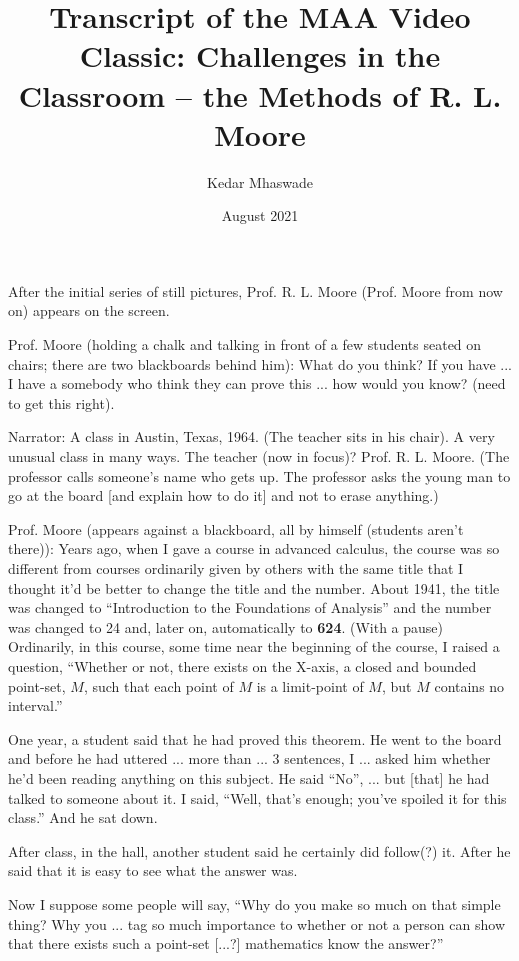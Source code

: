 \documentclass[a6paper]{article}
\begin{document}
\title{Transcript of the MAA Video Classic: Challenges in the Classroom -- the Methods of R. L. Moore}
\date{August 2021}
\author{Kedar Mhaswade}
\maketitle

After the initial series of still pictures, Prof. R. L. Moore (Prof. Moore from now on) appears on the screen.

Prof. Moore (holding a chalk and talking in front of a few students seated on chairs; there are two blackboards behind him): What do you think? If you have ... I have a somebody who think they can prove this ... how would you know?
(need to get this right).

Narrator: A class in Austin, Texas, 1964. (The teacher sits in his chair). A very unusual class in many ways. The teacher (now in focus)? Prof. R. L. Moore. (The professor calls someone's name who gets up. The professor asks the young man to go at the board [and explain how to do it] and not to erase anything.)

Prof. Moore (appears against a blackboard, all by himself (students aren't there)): Years ago, when I gave a course in advanced calculus, the course was so different from courses ordinarily given by others with the same title that I thought it'd be better to change the title and the number. About 1941, the title was changed to ``Introduction to the Foundations of Analysis'' and the number was changed to 24 and, later on, automatically to \textbf{624}. (With a pause) Ordinarily, in this course, some time near the beginning of the course, I raised a question, ``Whether or not, there exists on the X-axis, a closed and bounded point-set, $M$, such that each point of $M$ is a limit-point of $M$, but $M$ contains no interval.''  

One year, a student said that he had proved this theorem. He went to the board and before he had uttered ... more than ... 3 sentences, I ... asked him whether he'd been reading anything on this subject. He said ``No'', ... but [that] he had talked to someone about it. I said, ``Well, that's enough; you've spoiled it for this class.'' And he sat down. 

After class, in the hall, another student said he certainly did follow(?) it. After he said that it is easy to see what the answer was.

Now I suppose some people will say, ``Why do you make so much on that simple thing? Why you ... tag so much importance to whether or not a person can show that there exists such a point-set [...?] mathematics know the answer?'' 
\end{document}
